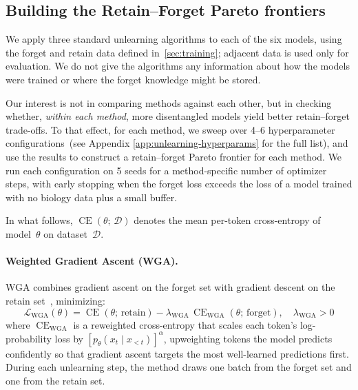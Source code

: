 \documentclass{article} %
\begin{document}
\subsection{Building the Retain--Forget Pareto frontiers}
\label{sec:unlearning}

We apply three standard unlearning algorithms to each of the six models, using the forget and retain data defined in~\cref{sec:training}; adjacent data is used only for evaluation.
We do not give the algorithms any information about how the models were trained or where the forget knowledge might be stored.

Our interest is not in comparing methods against each other, but in checking whether, \emph{within each method}, more disentangled models yield better retain--forget trade-offs.
To that effect, for each method, we sweep over 4--6 hyperparameter configurations~(see Appendix \ref{app:unlearning-hyperparams} for the full list), and use the results to construct a retain--forget Pareto frontier for each method.
We run each configuration on 5 seeds for a method-specific number of optimizer steps, with early stopping when the forget loss exceeds the loss of a model trained with no biology data plus a small buffer.

In what follows, $\operatorname{CE}(\theta;\, \mathcal{D})$ denotes the mean per-token cross-entropy of model~$\theta$ on dataset~$\mathcal{D}$.


\paragraph{Weighted Gradient Ascent (WGA).}
WGA combines gradient ascent on the forget set with gradient descent on the retain set~\citep{wang2025rethinking}, minimizing:
%
\begin{equation*}
  \mathcal{L}_\text{WGA}(\theta)
  = \operatorname{CE}(\theta;\, \text{retain})
  - \lambda_\text{WGA}\, \operatorname{CE}_\text{WGA}(\theta;\, \text{forget}),
  \quad \lambda_\text{WGA} > 0
\end{equation*}
%
where $\operatorname{CE}_\text{WGA}$ is a reweighted cross-entropy that scales each token's log-probability loss by $[p_\theta(x_t \mid x_{<t})]^\alpha$, upweighting tokens the model predicts confidently so that gradient ascent targets the most well-learned predictions first.
During each unlearning step, the method draws one batch from the forget set and one from the retain set.

\end{document}

